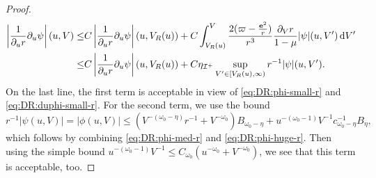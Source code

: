 \documentclass[10pt, reqno]{amsart}
\theoremstyle{definition}
\theoremstyle{remark}
\theoremstyle{conjecture}
\numberwithin{equation}{section}
\newcommand{\abs}[1]{\vert#1\vert}
\newcommand{\ud}{\mathrm{d}}
\newcommand{\rd}{\partial}
\newcommand{\0}{\emptyset}
\newcommand{\omg}{\omega}
\newcommand{\bfe}{{\bf e}}
\newcommand{\calI}{\mathcal I}
\newcommand{\e}{\bfe}							%
\newcommand{\NI}{\calI^{+}}						%
\newcommand{\Abs}[1]{\left\vert #1 \right\vert}
\begin{document}
\begin{proof}
\begin{align*}
	\Abs{\frac{1}{\rd_{u} r} \rd_{u} \psi}(u, V)
	\leq & C \Abs{\frac{1}{\rd_{u} r} \rd_{u} \psi}(u, V_{R}(u)) + C  \int_{V_{R}(u)}^{V} \frac{2 (\varpi - \frac{\e^{2}}{r})}{r^{3}} \frac{\rd_{V} r}{1-\mu} \abs{\psi} (u, V') \, \ud V' \\
	\leq & C \Abs{\frac{1}{\rd_{u} r} \rd_{u} \psi}(u, V_{R}(u)) + C \eta_{\NI} \sup_{V' \in [V_{R}(u), \infty)} r^{-1} \abs{\psi} (u, V') .
\end{align*}
On the last line, the first term is acceptable in view of \eqref{eq:DR:phi-small-r} and \eqref{eq:DR:duphi-small-r}. For the second term, we use the bound
\begin{equation*}
	r^{-1} \abs{\psi(u, V)} = \abs{\phi(u, V)} \leq (V^{-(\omg_{0}-\eta)} r^{-1} + V^{-\omg_{0}}) B_{\omg_{0}-\eta} + u^{-(\omg_{0}-1)} V^{-1} c_{\omg_{0} - \eta}^{-1}B_{\eta},
\end{equation*}
which follows by combining \eqref{eq:DR:phi-med-r} and \eqref{eq:DR:phi-huge-r}. Then using the simple bound $u^{-(\omg_{0} - 1)} V^{-1} \leq C_{\omg_{0}} (u^{- \omg_{0}} + V^{- \omg_{0}})$, we see that this term is acceptable, too.



\end{proof}
\end{document}
